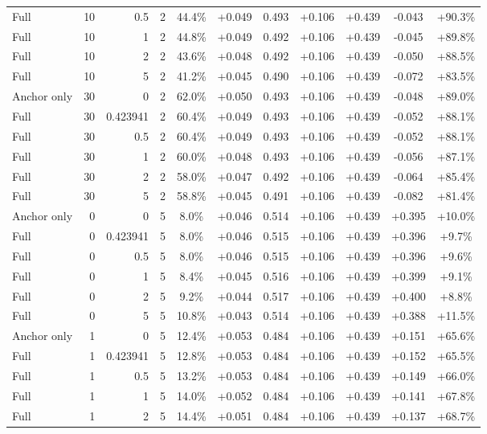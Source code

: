 \begin{table}[htbp]
\begin{tabular}{lrrrccccccc}
Full & 10 & 0.5 & 2 & 44.4\% & +0.049 & 0.493 & +0.106 & +0.439 & -0.043 & +90.3\% \\
Full & 10 & 1 & 2 & 44.8\% & +0.049 & 0.492 & +0.106 & +0.439 & -0.045 & +89.8\% \\
Full & 10 & 2 & 2 & 43.6\% & +0.048 & 0.492 & +0.106 & +0.439 & -0.050 & +88.5\% \\
Full & 10 & 5 & 2 & 41.2\% & +0.045 & 0.490 & +0.106 & +0.439 & -0.072 & +83.5\% \\
Anchor only & 30 & 0 & 2 & 62.0\% & +0.050 & 0.493 & +0.106 & +0.439 & -0.048 & +89.0\% \\
Full & 30 & 0.423941 & 2 & 60.4\% & +0.049 & 0.493 & +0.106 & +0.439 & -0.052 & +88.1\% \\
Full & 30 & 0.5 & 2 & 60.4\% & +0.049 & 0.493 & +0.106 & +0.439 & -0.052 & +88.1\% \\
Full & 30 & 1 & 2 & 60.0\% & +0.048 & 0.493 & +0.106 & +0.439 & -0.056 & +87.1\% \\
Full & 30 & 2 & 2 & 58.0\% & +0.047 & 0.492 & +0.106 & +0.439 & -0.064 & +85.4\% \\
Full & 30 & 5 & 2 & 58.8\% & +0.045 & 0.491 & +0.106 & +0.439 & -0.082 & +81.4\% \\
Anchor only & 0 & 0 & 5 & 8.0\% & +0.046 & 0.514 & +0.106 & +0.439 & +0.395 & +10.0\% \\
Full & 0 & 0.423941 & 5 & 8.0\% & +0.046 & 0.515 & +0.106 & +0.439 & +0.396 & +9.7\% \\
Full & 0 & 0.5 & 5 & 8.0\% & +0.046 & 0.515 & +0.106 & +0.439 & +0.396 & +9.6\% \\
Full & 0 & 1 & 5 & 8.4\% & +0.045 & 0.516 & +0.106 & +0.439 & +0.399 & +9.1\% \\
Full & 0 & 2 & 5 & 9.2\% & +0.044 & 0.517 & +0.106 & +0.439 & +0.400 & +8.8\% \\
Full & 0 & 5 & 5 & 10.8\% & +0.043 & 0.514 & +0.106 & +0.439 & +0.388 & +11.5\% \\
Anchor only & 1 & 0 & 5 & 12.4\% & +0.053 & 0.484 & +0.106 & +0.439 & +0.151 & +65.6\% \\
Full & 1 & 0.423941 & 5 & 12.8\% & +0.053 & 0.484 & +0.106 & +0.439 & +0.152 & +65.5\% \\
Full & 1 & 0.5 & 5 & 13.2\% & +0.053 & 0.484 & +0.106 & +0.439 & +0.149 & +66.0\% \\
Full & 1 & 1 & 5 & 14.0\% & +0.052 & 0.484 & +0.106 & +0.439 & +0.141 & +67.8\% \\
Full & 1 & 2 & 5 & 14.4\% & +0.051 & 0.484 & +0.106 & +0.439 & +0.137 & +68.7\% \\

\end{tabular}
\end{table}
